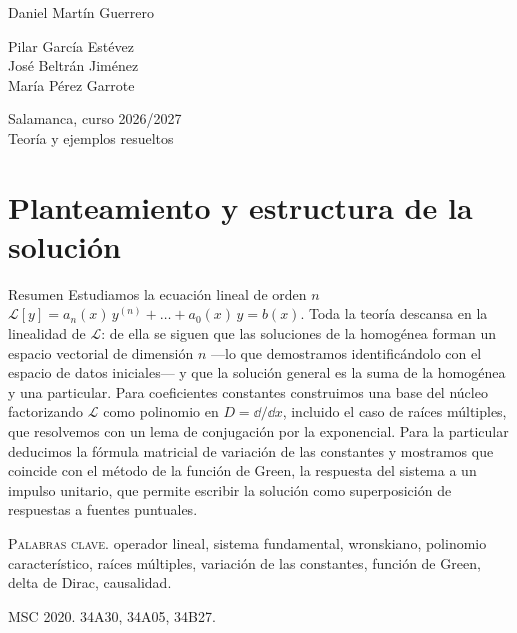 \documentclass[11pt,twoside]{article}
\newcommand\Lop{\mathcal L}
\begin{document}
\begin{titlepage}
\begin{minipage}[t]{0.32\textwidth}
{\small Daniel Martín Guerrero}
\end{minipage}\hfill
\begin{minipage}[t]{0.32\textwidth}\centering
{\color{acc}\footnotesize{}}\par\vspace{2pt}
{\small Pilar García Estévez\\ José Beltrán Jiménez\\ María Pérez Garrote}
\end{minipage}\hfill
\begin{minipage}[t]{0.32\textwidth}\raggedleft
{\color{acc}\footnotesize{}}\par\vspace{2pt}
{\small Salamanca, curso 2026/2027}\\[1pt]
{\footnotesize\color{muted}Teoría y ejemplos resueltos}
\end{minipage}
\end{titlepage}

\setcounter{page}{2}
{\hypersetup{linkcolor=fg}\tableofcontents}
\clearpage

\section{Planteamiento y estructura de la solución}\label{sec:planteamiento}

\begin{motivacion}{Resumen}
Estudiamos la ecuación lineal de orden $n$ $\Lop[y]=a_n(x)\,y^{(n)}+\dots+a_0(x)\,y=b(x)$. Toda la teoría descansa en
la linealidad de $\Lop$: de ella se siguen que las soluciones de la homogénea forman un espacio vectorial de dimensión
$n$ ---lo que demostramos identificándolo con el espacio de datos iniciales--- y que la solución general es la suma de
la homogénea y una particular. Para coeficientes constantes construimos una base del núcleo factorizando $\Lop$ como
polinomio en $D=\dd/\dd x$, incluido el caso de raíces múltiples, que resolvemos con un lema de conjugación por la
exponencial. Para la particular deducimos la fórmula matricial de variación de las constantes y mostramos que coincide
con el método de la función de Green, la respuesta del sistema a un impulso unitario, que permite escribir la solución
como superposición de respuestas a fuentes puntuales.

\smallskip
\textcolor{acc}{\textsc{Palabras clave.}} operador lineal, sistema fundamental, wronskiano, polinomio característico,
raíces múltiples, variación de las constantes, función de Green, delta de Dirac, causalidad.

\smallskip
\textcolor{acc}{\textsc{MSC 2020.}} 34A30, 34A05, 34B27.
\end{motivacion}
\end{document}
